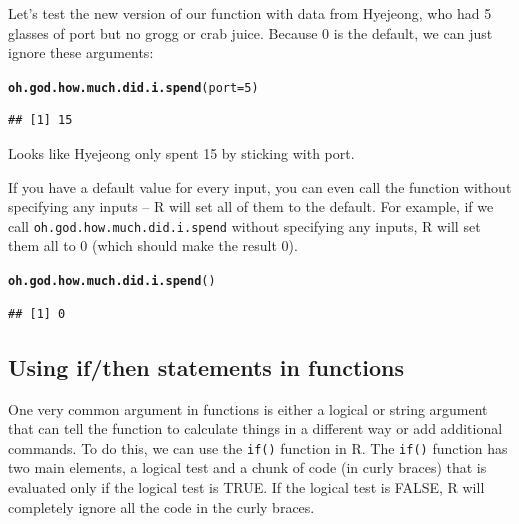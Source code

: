 \documentclass{tufte-book}\usepackage[]{graphicx}\usepackage[]{color}
\makeatletter
\newcommand{\hlnum}[1]{\textcolor[rgb]{0.686,0.059,0.569}{#1}}%
\newcommand{\hlstd}[1]{\textcolor[rgb]{0.345,0.345,0.345}{#1}}%
\newcommand{\hlkwc}[1]{\textcolor[rgb]{0.333,0.667,0.333}{#1}}%
\newcommand{\hlkwd}[1]{\textcolor[rgb]{0.737,0.353,0.396}{\textbf{#1}}}%
\newenvironment{kframe}{%
 \def\at@end@of@kframe{}%
 \ifinner\ifhmode%
  \def\at@end@of@kframe{\end{minipage}}%
  \begin{minipage}{\columnwidth}%
 \fi\fi%
 \def\FrameCommand##1{\hskip\@totalleftmargin \hskip-\fboxsep
 \colorbox{shadecolor}{##1}\hskip-\fboxsep
     \hskip-\linewidth \hskip-\@totalleftmargin \hskip\columnwidth}%
 \MakeFramed {\advance\hsize-\width
   \@totalleftmargin\z@ \linewidth\hsize
   \@setminipage}}%
 {\par\unskip\endMakeFramed%
 \at@end@of@kframe}
\newenvironment{knitrout}{}{} %
\makeatother
\begin{document}
Let's test the new version of our function with data from Hyejeong, who had 5 glasses of port but no grogg or crab juice. Because 0 is the default, we can just ignore these arguments:

\begin{knitrout}
\color{fgcolor}\begin{kframe}
\begin{alltt}
\hlkwd{oh.god.how.much.did.i.spend}\hlstd{(}\hlkwc{port} \hlstd{=} \hlnum{5}\hlstd{)}
\end{alltt}
\begin{verbatim}
## [1] 15
\end{verbatim}
\end{kframe}
\end{knitrout}

Looks like Hyejeong only spent 15 by sticking with port.

\begin{marginfigure}
If you have a default value for every input, you can even call the function without specifying any inputs -- R will set all of them to the default. For example, if we call \texttt{oh.god.how.much.did.i.spend} without specifying any inputs, R will set them all to 0 (which should make the result 0).
\begin{knitrout}
\color{fgcolor}\begin{kframe}
\begin{alltt}
\hlkwd{oh.god.how.much.did.i.spend}\hlstd{()}
\end{alltt}
\begin{verbatim}
## [1] 0
\end{verbatim}
\end{kframe}
\end{knitrout}
\end{marginfigure}

\subsection{Using if/then statements in functions}

One very common argument in functions is either a logical or string argument that can tell the function to calculate things in a different way or add additional commands. To do this, we can use the \texttt{if()} function in R. The \texttt{if()} function has two main elements, a logical test and a chunk of code (in curly braces) that is evaluated only if the logical test is TRUE. If the logical test is FALSE, R will completely ignore all the code in the curly braces.
\end{document}
